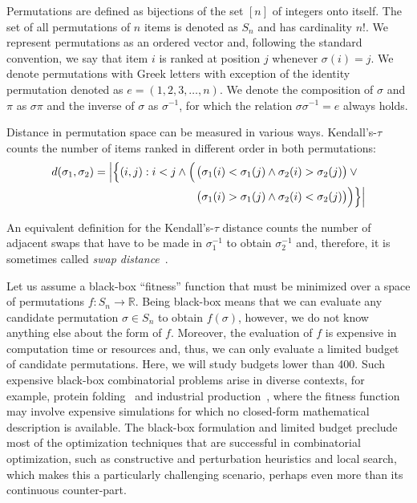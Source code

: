 \documentclass[runningheads]{llncs}
\begin{document}
Permutations are defined as bijections of the set $[n]$ of integers onto itself. The set of all permutations of $n$ items is denoted as $S_n$ and has cardinality $n!$. We represent permutations as an ordered vector and, following the standard convention, we say that item $i$ is ranked at position $j$ whenever $\sigma(i)=j$. We denote permutations with Greek letters with exception of the identity permutation denoted as $e=(1, 2, 3, \dotsc,n)$. We denote the composition of $\sigma$ and $\pi$ as $\sigma\pi$ and the inverse of $\sigma$ as $\sigma^{-1}$, for which the relation $\sigma\sigma^{-1}=e$ always holds.


Distance in permutation space can be measured in various ways.  Kendall's-$\tau$ counts the number of items ranked in different order in both permutations:
%
\begin{equation}
\begin{split}
d(\sigma _{1},\sigma_{2})=\left\lvert\Bigl\{(i,j):i<j \land \phantom{}\Bigl(\right.&\bigl(\sigma_{1}(i) < \sigma_{1}(j)\land \sigma_{2}(i)>\sigma_{2}(j)\bigr)\lor \phantom{} \\
 &\bigl(\sigma_{1}(i)>\sigma_{1}(j)\land \sigma_{2}(i)<\sigma_{2}(j)\bigr)\Bigr)\Bigr\}\Bigr\rvert\\
 \end{split}
 \label{eq:kendall_decomp}
\end{equation}

An equivalent definition for the Kendall's-$\tau$ distance counts the number of adjacent swaps that have to be made in $\sigma_1^{-1}$ to obtain $\sigma_2^{-1}$ and, therefore, it is sometimes called \emph{swap distance}~\citep{ZaeStoBar2014:ppsn}.

Let us assume a black-box ``fitness'' function that must be minimized over a
space of permutations $f\colon S_n \to \mathbb{R}$. Being black-box means that
we can evaluate any candidate permutation $\sigma \in S_n$ to obtain
$f(\sigma)$, however, we do not know anything else about the form of
$f$. Moreover, the evaluation of $f$ is expensive in computation time or
resources and, thus, we can only evaluate a limited budget of candidate
permutations. Here, we will study budgets lower than 400. Such expensive
black-box combinatorial problems arise in diverse contexts, for example,
protein folding~\citep{RomKraArn2012protein} and industrial
production~\citep{FerAlvDiaIglEna2014ants}, where the fitness function may
involve expensive simulations for which no closed-form mathematical description
is available. The black-box formulation and limited budget preclude most of the
optimization techniques that are successful in combinatorial optimization, such
as constructive and perturbation heuristics and local search, which makes this
a particularly challenging scenario, perhaps even more than its continuous
counter-part.
\end{document}
